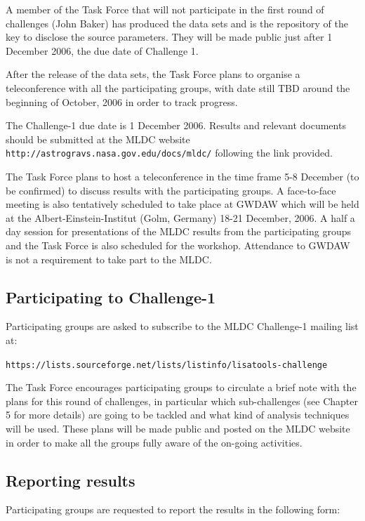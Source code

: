 \documentclass[11pt]{report}
\begin{document}
A member of the Task Force that will not participate in the first round of challenges (John Baker) has produced the data sets and is the repository of the key to disclose the source parameters. They will be made public just after 1 December 2006, the due date of Challenge 1.

After the release of the data sets, the Task Force plans to organise a teleconference with all the participating groups, with date still TBD around the beginning of October, 2006 in order to track progress.

The {\rm Challenge-1 due date is 1 December 2006}. Results and relevant documents should be submitted at the MLDC website {\tt http://astrogravs.nasa.gov.edu/docs/mldc/} following the link provided.

The Task Force plans to host a teleconference in the time frame 5-8 December (to be confirmed) to discuss results with the participating groups. A face-to-face meeting is also tentatively scheduled to take place at GWDAW which will be held at the Albert-Einstein-Institut (Golm, Germany) 18-21 December, 2006. A half a day session for presentations of the MLDC results from the participating groups and the Task Force is also scheduled for the workshop. Attendance to GWDAW is not a requirement to take part to the MLDC.

\subsection{Participating to Challenge-1}

Participating groups are asked to subscribe to the MLDC Challenge-1 mailing list at:

 {\tt https://lists.sourceforge.net/lists/listinfo/lisatools-challenge}

The Task Force encourages participating groups to circulate a brief note with the plans for this round of challenges, in particular which sub-challenges (see Chapter 5 for more details) are going to be tackled and what kind of analysis techniques will be used. These plans will be made public and posted on the MLDC website in order to make all the groups fully aware of the on-going activities.

\subsection{Reporting results}

Participating groups are requested to report the results in the following form:
\end{document}
